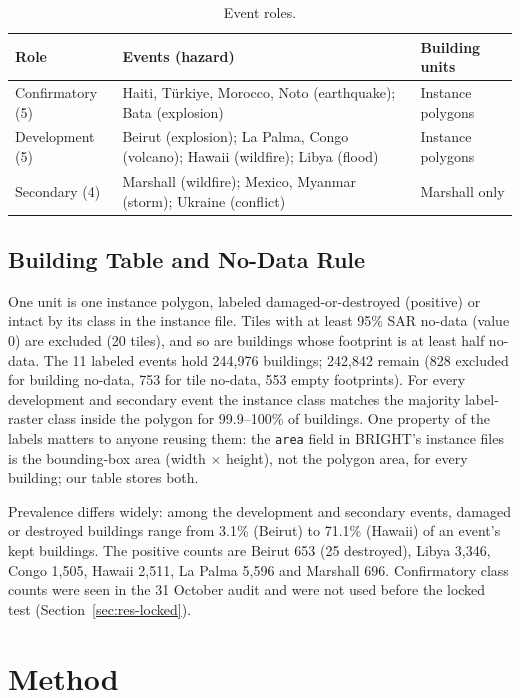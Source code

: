 \documentclass{ieeeaccess}
\begin{document}
\begin{table}[t]
\centering
\caption{Event roles.}
\label{tab:roles}
\footnotesize
\begin{tabular}{@{}L{1.55cm}L{3.9cm}L{1.95cm}@{}}
\toprule
Role & Events (hazard) & Building units \\
\midrule
Confirmatory (5) & Haiti, T\"urkiye, Morocco, Noto (earthquake); Bata (explosion) & Instance polygons \\
Development (5) & Beirut (explosion); La Palma, Congo (volcano); Hawaii (wildfire); Libya (flood) & Instance polygons \\
Secondary (4) & Marshall (wildfire); Mexico, Myanmar (storm); Ukraine (conflict) & Marshall only \\
\bottomrule
\end{tabular}
\end{table}

\subsection{Building Table and No-Data Rule}
One unit is one instance polygon, labeled damaged-or-destroyed (positive) or intact by its class in the instance file. Tiles with at least 95\% SAR no-data (value 0) are excluded (20 tiles), and so are buildings whose footprint is at least half no-data. The 11 labeled events hold 244,976 buildings; 242,842 remain (828 excluded for building no-data, 753 for tile no-data, 553 empty footprints). For every development and secondary event the instance class matches the majority label-raster class inside the polygon for 99.9--100\% of buildings. One property of the labels matters to anyone reusing them: the \texttt{area} field in BRIGHT's instance files is the bounding-box area (width $\times$ height), not the polygon area, for every building; our table stores both.

Prevalence differs widely: among the development and secondary events, damaged or destroyed buildings range from 3.1\% (Beirut) to 71.1\% (Hawaii) of an event's kept buildings. The positive counts are Beirut 653 (25 destroyed), Libya 3,346, Congo 1,505, Hawaii 2,511, La Palma 5,596 and Marshall 696. Confirmatory class counts were seen in the 31 October audit and were not used before the locked test (Section~\ref{sec:res-locked}).

\section{Method}
\label{sec:method}
\end{document}
